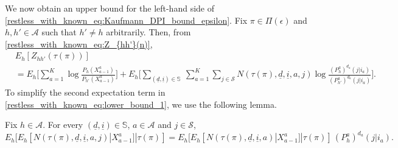 We now obtain an upper bound for the left-hand side of \eqref{restless_with_known_eq:Kaufmann_DPI_bound_epsilon}. Fix $\pi\in\Pi(\epsilon)$ and $h, h'\in \mathcal{A}$ such that $h'\neq h$ arbitrarily. Then, from \eqref{restless_with_known_eq:Z_{hh'}(n)},
\begingroup \allowdisplaybreaks\begin{align}
	& E_h[Z_{hh'}(\tau(\pi))]\nonumber\\
	&=E_h\bigg[\sum\limits_{a=1}^{K}\log\frac{P_h(X_{a-1}^a)}{P_{h'}(X_{a-1}^a)}\bigg]+E_h\bigg[\sum\limits_{(\underline{d},\underline{i})\in\mathbb{S}}~\sum\limits_{a=1}^{K}\sum\limits_{j\in\mathcal{S}}N(\tau(\pi),\underline{d},\underline{i},a,j)\log\frac{(P_h^{a})^{d_a}(j|i_a)}{(P_{h'}^{a})^{d_a}(j|i_a)}\bigg].\label{restless_with_known_eq:lower_bound_1}
\end{align}\endgroup
To simplify the second expectation term in \eqref{restless_with_known_eq:lower_bound_1}, we use the following lemma.
\begin{lemma}\label{restless_with_known_lem:relation_between_N(tau,d,i,j,a)_and_N(tau,d,i,a)}
	{\color{black} Fix $h\in \mathcal{A}$. For every $(\underline{d},\underline{i})\in \mathbb{S}$, $a\in\mathcal{A}$ and $j\in \mathcal{S}$,}
	\begin{equation}
		E_h[E_h[N(\tau(\pi),\underline{d},\underline{i},a,j)|X_{a-1}^a]|\tau(\pi)]=E_h[E_h[N(\tau(\pi),\underline{d},\underline{i},a)|X_{a-1}^a]|\tau(\pi)]\,(P_h^a)^{d_a}(j|i_a).\label{restless_with_known_eq:relation_between_N(tau,d,i,j,a)_and_N(tau,d,i,a)}
	\end{equation}
\end{lemma}

